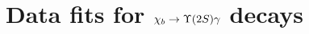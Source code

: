 \chapter{Data fits for \texorpdfstring{$\chib \to \Y2S \gamma$}{chib --> Y(2S) gamma} decays}
\label{sec:chib:ups2s:fits}

